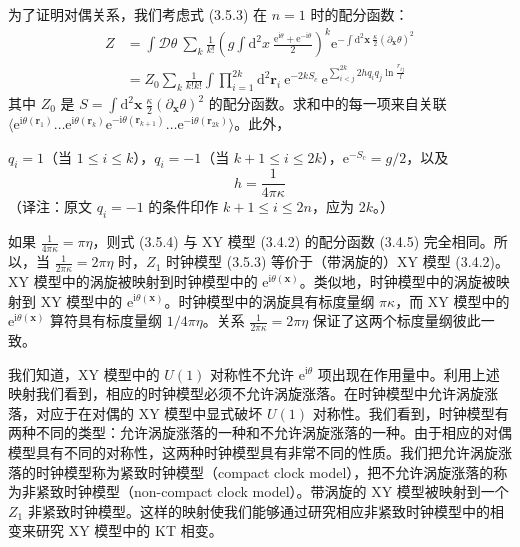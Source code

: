 为了证明对偶关系，我们考虑式 (3.5.3) 在 $n = 1$ 时的配分函数：
\begin{equation*}
\begin{aligned}
Z &= \int \mathcal{D}\theta\ \sum_{k} \frac{1}{k!}\left( g\int \mathrm{d}^{2}x\ \frac{\mathrm{e}^{\mathrm{i}\theta} + \mathrm{e}^{-\mathrm{i}\theta}}{2} \right)^{k} \mathrm{e}^{-\int \mathrm{d}^{2}\pmb{x}\ \frac{\kappa}{2}(\partial_{\pmb{x}}\theta)^{2}} \\
&= Z_{0} \sum_{k} \frac{1}{k!k!} \int \prod_{i=1}^{2k} \mathrm{d}^{2}\pmb{r}_{i}\ \mathrm{e}^{-2kS_{c}}\ \mathrm{e}^{\sum_{i<j}^{2k} 2hq_{i}q_{j}\ln\frac{r_{ij}}{l}}
\end{aligned}
\tag{3.5.4}
\end{equation*}
其中 $Z_{0}$ 是 $S = \int \mathrm{d}^{2}\pmb{x}\ \frac{\kappa}{2}(\partial_{\pmb{x}}\theta)^{2}$ 的配分函数。求和中的每一项来自关联 $\langle \mathrm{e}^{\mathrm{i}\theta(\pmb{r}_{1})}\allowbreak\ldots\allowbreak\mathrm{e}^{\mathrm{i}\theta(\pmb{r}_{k})}\allowbreak\mathrm{e}^{-\mathrm{i}\theta(\pmb{r}_{k+1})}\allowbreak\ldots\allowbreak\mathrm{e}^{-\mathrm{i}\theta(\pmb{r}_{2k})}\rangle$。此外，

$q_{i} = 1$（当 $1 \leqslant i \leqslant k$），$q_{i} = -1$（当 $k+1 \leqslant i \leqslant 2k$），$\mathrm{e}^{-S_{c}} = g/2$，以及
\begin{equation*}
h = \frac{1}{4\pi\kappa}
\end{equation*}
（译注：原文 $q_{i} = -1$ 的条件印作 $k+1 \leqslant i \leqslant 2n$，应为 $2k$。）

如果 $\frac{1}{4\pi\kappa} = \pi\eta$，则式 (3.5.4) 与 XY 模型 (3.4.2) 的配分函数 (3.4.5) 完全相同。所以，当 $\frac{1}{2\pi\kappa} = 2\pi\eta$ 时，$Z_{1}$ 时钟模型 (3.5.3) 等价于（带涡旋的）XY 模型 (3.4.2)。XY 模型中的涡旋被映射到时钟模型中的 $\mathrm{e}^{\mathrm{i}\theta(\pmb{x})}$。类似地，时钟模型中的涡旋被映射到 XY 模型中的 $\mathrm{e}^{\mathrm{i}\theta(\pmb{x})}$。时钟模型中的涡旋具有标度量纲 $\pi\kappa$，而 XY 模型中的 $\mathrm{e}^{\mathrm{i}\theta(\pmb{x})}$ 算符具有标度量纲 $1/4\pi\eta$。关系 $\frac{1}{2\pi\kappa} = 2\pi\eta$ 保证了这两个标度量纲彼此一致。

我们知道，XY 模型中的 $U(1)$ 对称性不允许 $\mathrm{e}^{\mathrm{i}\theta}$ 项出现在作用量中。利用上述映射我们看到，相应的时钟模型必须不允许涡旋涨落。在时钟模型中允许涡旋涨落，对应于在对偶的 XY 模型中显式破坏 $U(1)$ 对称性。我们看到，时钟模型有两种不同的类型：允许涡旋涨落的一种和不允许涡旋涨落的一种。由于相应的对偶模型具有不同的对称性，这两种时钟模型具有非常不同的性质。我们把允许涡旋涨落的时钟模型称为紧致时钟模型（compact clock model），把不允许涡旋涨落的称为非紧致时钟模型（non-compact clock model）。带涡旋的 XY 模型被映射到一个 $Z_{1}$ 非紧致时钟模型。这样的映射使我们能够通过研究相应非紧致时钟模型中的相变来研究 XY 模型中的 KT 相变。

